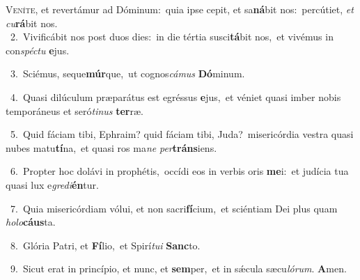 \lettrine{\initial\textcolor{\initialcolor}{V}}{eníte,} et revertámur ad Dóminum:~\dagger quia ipse cepit, et sa\-\textbf{ná}\-bit nos:~\star percútiet, \textit{et} \textit{cu}\-\textbf{rá}bit nos.\\
{\numbfont\textcolor{\numbcolor}{~2.}}~Vivificábit nos post duos dies:~\dagger in die tértia susci\-\textbf{tá}\-bit nos,~\star et vivémus in con\-\textit{spéc}\-\textit{tu} \textbf{e}\-jus.\par
{\numbfont\textcolor{\numbcolor}{~3.}}~Sciémus, seque\-\textbf{múr}\-que,~\star ut cognos\-\textit{cá}\-\textit{mus} \textbf{Dó}\-minum.\par
{\numbfont\textcolor{\numbcolor}{~4.}}~Quasi dilúculum præparátus est egréssus \textbf{e}\-jus,~\star et véniet quasi imber nobis temporáneus et seró\-\textit{ti}\-\textit{nus} \textbf{ter}\-ræ.\par
{\numbfont\textcolor{\numbcolor}{~5.}}~Quid fáciam tibi, Ephraim? quid fáciam tibi, Juda?~\dagger misericórdia vestra quasi nubes matu\-\textbf{tí}\-na,~\star et quasi ros ma\textit{ne} \textit{per}\-\textbf{tráns}iens.\par
{\numbfont\textcolor{\numbcolor}{~6.}}~Propter hoc dolávi in prophétis,~\dagger occídi eos in verbis oris \textbf{me}\-i:~\star et judícia tua quasi lux e\-\textit{gre}\-\textit{di}\textbf{én}tur.\par
{\numbfont\textcolor{\numbcolor}{~7.}}~Quia misericórdiam vólui, et non sacri\-\textbf{fí}\-cium,~\star et sciéntiam Dei plus quam \textit{ho}\-\textit{lo}\textbf{cáus}ta.\par
{\numbfont\textcolor{\numbcolor}{~8.}}~Glória Patri, et \textbf{Fí}\-lio,~\star et Spirí\-\textit{tu}\-\textit{i} \textbf{Sanc}\-to.\par
{\numbfont\textcolor{\numbcolor}{~9.}}~Sicut erat in princípio, et nunc, et \textbf{sem}\-per,~\star et in sǽcula sæcu\-\textit{ló}\-\textit{rum}. \textbf{A}\-men.\par
